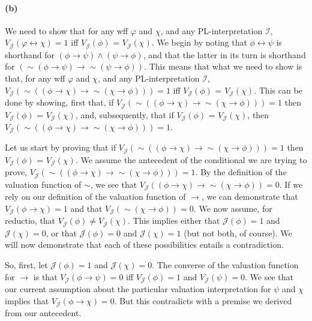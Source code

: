 \documentclass[sloppy, journal, git, bytitle]{humapap}
\begin{document}
\paragraph{(b)} We need to show that for any wff $\varphi$ and $\chi$, and any PL-interpretation $\mathcal{I}$, $V\mathcal{_J}(\varphi\leftrightarrow\chi)=1$ iff $V\mathcal{_J}(\phi)$ = $V\mathcal{_J}(\chi)$. We begin by noting that $\phi\leftrightarrow\psi$ is shorthand for $(\phi\rightarrow\psi)\wedge(\psi\rightarrow\phi)$, and that the latter in its turn is shorthand for $(\sim(\phi\rightarrow\psi)\rightarrow\sim(\psi\rightarrow\phi))$.  
This means that what we need to show is that, for any wff $\varphi$ and $\chi$, and any PL-interpretation $\mathcal{I}$, $V\mathcal{_J}(\sim((\phi\rightarrow\chi)\rightarrow\sim(\chi\rightarrow\phi)))=1$ iff $V\mathcal{_J}(\phi)$ = $V\mathcal{_J}(\chi)$. This can be done by showing, first that, if $V\mathcal{_J}(\sim((\phi\rightarrow\chi)\rightarrow\sim(\chi\rightarrow\phi)))=1$ then $V\mathcal{_J}(\phi)$ = $V\mathcal{_J}(\chi)$, and, subsequently, that if $V\mathcal{_J}(\phi)$ = $V\mathcal{_J}(\chi)$, then $V\mathcal{_J}(\sim((\phi\rightarrow\chi)\rightarrow\sim(\chi\rightarrow\phi)))=1$. 

Let us start by proving that if $V\mathcal{_J}(\sim((\phi\rightarrow\chi)\rightarrow\sim(\chi\rightarrow\phi)))=1$ then $V\mathcal{_J}(\phi)$ = $V\mathcal{_J}(\chi)$. 
We assume the antecedent of the conditional we are trying to prove, $V\mathcal{_J}(\sim((\phi\rightarrow\chi)\rightarrow\sim(\chi\rightarrow\phi)))=1$. 
By the definition of the valuation function of $\sim$, we see that $V\mathcal{_J}((\phi\rightarrow\chi)\rightarrow\sim(\chi\rightarrow\phi))=0$. 
If we rely on our definition of the valuation function of $\rightarrow$, we can demonstrate that $V\mathcal{_J}(\phi\rightarrow\chi)=1$ and that $V\mathcal{_J}(\sim(\chi\rightarrow\phi))=0$. 
We now assume, for reductio, that $V\mathcal{_J}(\phi) \neq  V\mathcal{_J}(\chi)$.
This implies either that $\mathcal{J}(\phi)=1$ and $\mathcal{J}(\chi)=0$, or that $\mathcal{J}(\phi)=0$ and $\mathcal{J}(\chi)=1$ (but not both, of course). 
We will now demonstrate that each of these possibilities entails a contradiction. 

So, first, let $\mathcal{J}(\phi)=1$ and $\mathcal{J}(\chi)=0$.
The converse of the valuation function for $\rightarrow$ is that $V\mathcal{_J}(\phi\rightarrow\psi)=0$ iff $V\mathcal{_J}(\phi)=1$ and $V\mathcal{_J}(\psi)=0$. We see that our current assumption about the particular valuation interpretation for $\psi$ and $\chi$ implies that $V\mathcal{_J}(\phi\rightarrow\chi)=0$. But this contradicts with a premise we derived from our antecedent. 
\end{document}
